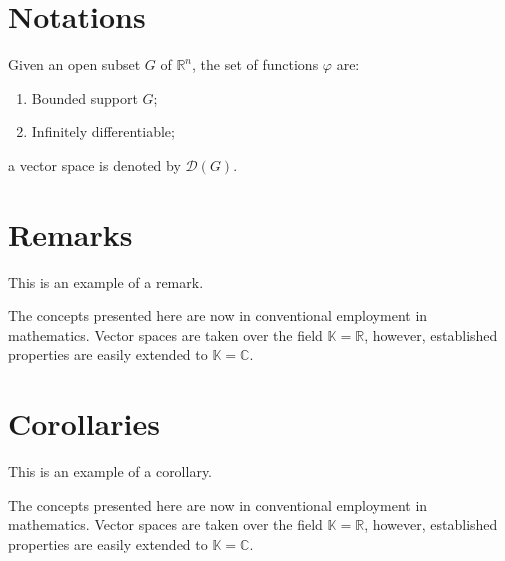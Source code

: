 \documentclass[12pt,fleqn,a4paper]{book} %
\begin{document}
    
    \section{Notations}
    
    \begin{notation}
    Given an open subset $G$ of $\mathbb{R}^n$, the set of functions $\varphi$ are:
    \begin{enumerate}
    \item Bounded support $G$;
    \item Infinitely differentiable;
    \end{enumerate}
    a vector space is denoted by $\mathcal{D}(G)$. 
    \end{notation}
    
    
    \section{Remarks}
    
    This is an example of a remark.
    
    \begin{remark}
    The concepts presented here are now in conventional employment in mathematics. Vector spaces are taken over the field $\mathbb{K}=\mathbb{R}$, however, established properties are easily extended to $\mathbb{K}=\mathbb{C}$.
    \end{remark}
    
    
    \section{Corollaries}
    
    This is an example of a corollary.
    
    \begin{corollary}
    The concepts presented here are now in conventional employment in mathematics. Vector spaces are taken over the field $\mathbb{K}=\mathbb{R}$, however, established properties are easily extended to $\mathbb{K}=\mathbb{C}$.
    \end{corollary}
    
    
\end{document}
